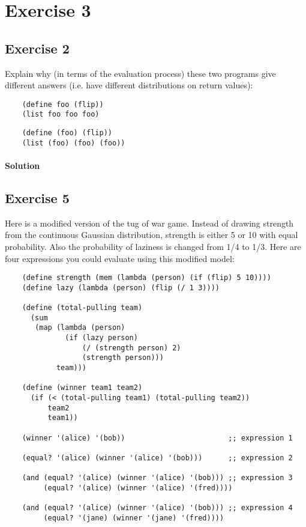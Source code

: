 \section*{Exercise 3}

\subsection*{Exercise 2}
Explain why (in terms of the evaluation process) these two programs give different answers 
(i.e. have different distributions on return values):
\begin{lstlisting}
    (define foo (flip))
    (list foo foo foo)
\end{lstlisting}

\begin{lstlisting}
    (define (foo) (flip))
    (list (foo) (foo) (foo))
\end{lstlisting}    

\paragraph{Solution}


\subsection*{Exercise 5}
Here is a modified version of the tug of war game. Instead of drawing strength from the continuous Gaussian 
distribution, strength is either 5 or 10 with equal probability. Also the probability of laziness is changed from 1/4 to 1/3. 
Here are four expressions you could evaluate using this modified model:

\begin{lstlisting}
    (define strength (mem (lambda (person) (if (flip) 5 10))))
    (define lazy (lambda (person) (flip (/ 1 3))))

    (define (total-pulling team)
      (sum
       (map (lambda (person)
              (if (lazy person)
                  (/ (strength person) 2) 
                  (strength person)))
            team)))

    (define (winner team1 team2) 
      (if (< (total-pulling team1) (total-pulling team2)) 
          team2 
          team1))

    (winner '(alice) '(bob))                        ;; expression 1

    (equal? '(alice) (winner '(alice) '(bob)))      ;; expression 2

    (and (equal? '(alice) (winner '(alice) '(bob))) ;; expression 3
         (equal? '(alice) (winner '(alice) '(fred))))

    (and (equal? '(alice) (winner '(alice) '(bob))) ;; expression 4
         (equal? '(jane) (winner '(jane) '(fred))))
\end{lstlisting}

